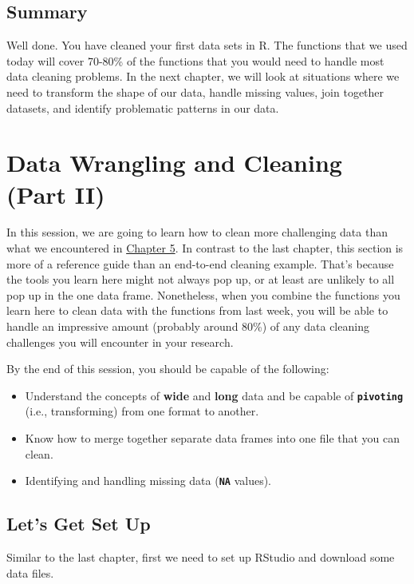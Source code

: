 \documentclass[
]{book}
\begin{document}
\section{Summary}\label{summary-5}

Well done. You have cleaned your first data sets in R. The functions that we used today will cover 70-80\% of the functions that you would need to handle most data cleaning problems. In the next chapter, we will look at situations where we need to transform the shape of our data, handle missing values, join together datasets, and identify problematic patterns in our data.

\chapter{Data Wrangling and Cleaning (Part II)}\label{datacleaning2}

In this session, we are going to learn how to clean more challenging data than what we encountered in \hyperref[datacleaning1]{Chapter 5}. In contrast to the last chapter, this section is more of a reference guide than an end-to-end cleaning example. That's because the tools you learn here might not always pop up, or at least are unlikely to all pop up in the one data frame. Nonetheless, when you combine the functions you learn here to clean data with the functions from last week, you will be able to handle an impressive amount (probably around 80\%) of any data cleaning challenges you will encounter in your research.

By the end of this session, you should be capable of the following:

\begin{itemize}
\item
  Understand the concepts of \textbf{wide} and \textbf{long} data and be capable of \textbf{\texttt{pivoting}} (i.e., transforming) from one format to another.
\item
  Know how to merge together separate data frames into one file that you can clean.
\item
  Identifying and handling missing data (\textbf{\texttt{NA}} values).
\end{itemize}

\section{Let's Get Set Up}\label{lets-get-set-up-1}

Similar to the last chapter, first we need to set up RStudio and download some data files.
\end{document}
